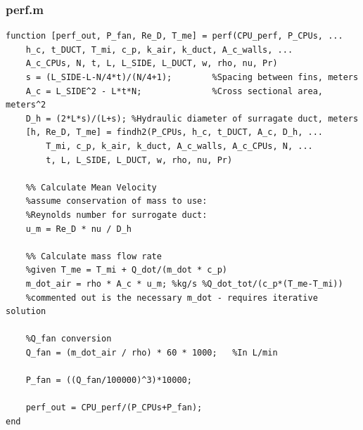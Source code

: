 \documentclass[12pt, titlepage]{article}
\begin{document}
\subsubsection{perf.m}
\begin{verbatim}
function [perf_out, P_fan, Re_D, T_me] = perf(CPU_perf, P_CPUs, ...
    h_c, t_DUCT, T_mi, c_p, k_air, k_duct, A_c_walls, ...
    A_c_CPUs, N, t, L, L_SIDE, L_DUCT, w, rho, nu, Pr)
    s = (L_SIDE-L-N/4*t)/(N/4+1);        %Spacing between fins, meters
    A_c = L_SIDE^2 - L*t*N;              %Cross sectional area, meters^2
    D_h = (2*L*s)/(L+s); %Hydraulic diameter of surragate duct, meters
    [h, Re_D, T_me] = findh2(P_CPUs, h_c, t_DUCT, A_c, D_h, ...
        T_mi, c_p, k_air, k_duct, A_c_walls, A_c_CPUs, N, ...
        t, L, L_SIDE, L_DUCT, w, rho, nu, Pr)

    %% Calculate Mean Velocity
    %assume conservation of mass to use:
    %Reynolds number for surrogate duct:
    u_m = Re_D * nu / D_h
    
    %% Calculate mass flow rate
    %given T_me = T_mi + Q_dot/(m_dot * c_p)
    m_dot_air = rho * A_c * u_m; %kg/s %Q_dot_tot/(c_p*(T_me-T_mi))
    %commented out is the necessary m_dot - requires iterative solution
    
    %Q_fan conversion
    Q_fan = (m_dot_air / rho) * 60 * 1000;   %In L/min
    
    P_fan = ((Q_fan/100000)^3)*10000;

    perf_out = CPU_perf/(P_CPUs+P_fan);
end
\end{verbatim}
\end{document}
